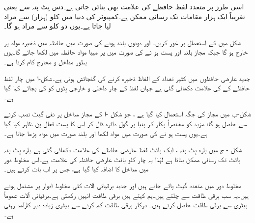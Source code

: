 اسی طرز پر متعدد لفظ  حافظے  کی علامت   بھی بنائی جاتی ہے۔دس بِٹ پتہ سے     یعنی  تقریباً ایک ہزار مقامات تک رسائی ممکن ہے۔کمپیوٹر کی دنیا  میں  کلو (ہزار) سے مراد     لیا جاتا ہے۔یوں دو  کلو سے مراد   ہو گا۔


شکل   میں    کے استعمال  پر غور کریں۔ اور     دونوں بلند ہونے کی صورت میں  حافظہ میں ذخیرہ مواد    پر خارج ہو گا جبکہ  مجاز بلند اور     پست ہو نے  کی صورت میں   پر  مہیا مواد حافظہ میں لکھا جائے گا۔یوں  بطور مداخل و مخارج   کام کرتا ہے۔

جدید عارضی حافظوں میں کثیر تعداد  کے الفاظ ذخیرہ کرنے کی گنجائش ہوتی ہے۔شکل-ا میں چار  لفظ  حافظے کے  کی علامت دکھائی گئی ہے  جہاں لفظ کے چار داخلی  و خارجی بِٹوں  کو  کی  بجائے  کہا گیا ہے۔

شکل-ب  میں مجاز کی جگہ  استعمال کیا گیا ہے ، جو شکل -ا کے مجاز مداخل پر نفی گیٹ نصب کرنے سے حاصل  ہو گا؛  مزید     کو مختصراً     پکار کر   پنیا پر گول دائرہ  ڈال کر اس کا  پست فعال  پن ظاہر کیا گیا ہے۔یوں  پست ہو نے کی صورت میں مواد لکھا اور بلند صورت میں     مواد پڑھا جاتا ہے۔

شکل - ج میں  بارہ بِٹ پتہ ،  ایک بائٹ   لفظ عارضی حافظے کی علامت دکھائی گئی ہے۔بارہ بِٹ پتہ   بائٹ تک رسائی ممکن بناتا  ہے لہٰذا  یہ چار کلو بائٹ عارضی حافظہ کی   علامت ہے۔اس مخلوط دور میں   مداخل کا اضافہ کیا گیا ہے، جس پر اب بات کرتے ہیں۔


 مخلوط دور میں متعدد  گیٹ پائے جاتے ہیں اور جدید  برقیاتی  آلات کئی مخلوط ادوار پر مشتمل ہوتے ہیں۔یہ سب  برقی طاقت سے چلتے ہیں۔ہم کہتے ہیں برقی طاقت انہیں  رکھتی  ہے۔برقیاتی  آلات عموماً  بیٹری سے برقی طاقت حاصل کرتے ہیں۔ درکار برقی طاقت کم  کرنے سے بیٹری زیادہ دیر کارآمد رہتی ہے۔
 
